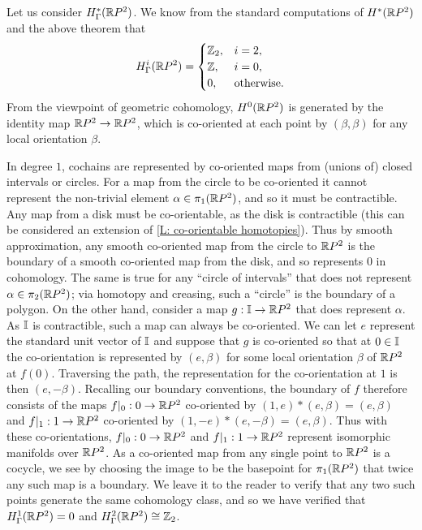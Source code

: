 \begin{example}
Let us consider $H^*_\Gamma(\mathbb{R} P^2)$. We know from the standard computations of $H^*(\mathbb{R} P^2)$ and the above theorem that
\begin{equation*}
H_\Gamma^i(\mathbb{R} P^2)=
\begin{cases}
\mathbb{Z}_2,&i=2,\\
\mathbb{Z},&i=0,\\
0,&\text{otherwise.}
\end{cases}
\end{equation*}
From the viewpoint of geometric cohomology, $H^0(\mathbb{R} P^2)$ is generated by the identity map $\mathbb{R} P^2\to \mathbb{R} P^2$, which is co-oriented at each point by  $(\beta,\beta)$ for any local orientation $\beta$.

In degree $1$, cochains are represented by co-oriented maps from (unions of) closed intervals or circles. For a map from the circle to be co-oriented it cannot represent the non-trivial element $\alpha\in \pi_1(\mathbb{R} P^2)$, and so it must be contractible. Any map from a disk must be co-orientable, as the disk is contractible (this can be considered an extension of \cref{L: co-orientable homotopies}). Thus by smooth approximation, any smooth co-oriented map from the circle to $\mathbb{R} P^2$ is the boundary of a smooth co-oriented map from the disk, and so represents $0$ in cohomology. The same is true for any ``circle of intervals'' that does not represent $\alpha\in \pi_2(\mathbb{R} P^2)$; via homotopy and creasing, such a ``circle'' is the boundary of a polygon. On the other hand, consider a map $g:\mathbb{I}\to \mathbb{R} P^2$ that does represent $\alpha$. As $\mathbb{I}$ is contractible, such a map can always be co-oriented. We can let $e$ represent the standard unit vector of $\mathbb{I}$ and suppose that $g$ is co-oriented so that at $0\in \mathbb{I}$ the co-orientation is represented by $(e,\beta)$ for some local orientation $\beta$ of $\mathbb{R} P^2$ at $f(0)$. Traversing the path, the representation for the co-orientation at $1$ is then $(e,-\beta)$. Recalling our boundary conventions, the boundary of $f$ therefore consists of the maps $f|_0:0\to \mathbb{R} P^2$ co-oriented by $(1,e)*(e,\beta)=(e,\beta)$ and $f|_1:1\to \mathbb{R} P^2$ co-oriented by $(1,-e)*(e,-\beta)=(e,\beta)$. Thus with these co-orientations, $f|_0:0\to \mathbb{R} P^2$ and $f|_1:1\to \mathbb{R} P^2$ represent isomorphic manifolds over $\mathbb{R} P^2$. As a co-oriented map from any single point to $\mathbb{R} P^2$ is a cocycle, we see by choosing the image to be the basepoint for $\pi_1(\mathbb{R} P^2)$ that twice any such map is a boundary. We leave it to the reader to verify that any two such points generate the same cohomology class, and so we have verified that $H^1_\Gamma(\mathbb{R} P^2)=0$ and $H_\Gamma^2(\mathbb{R} P^2)\cong \mathbb{Z}_2$.
\end{example}

